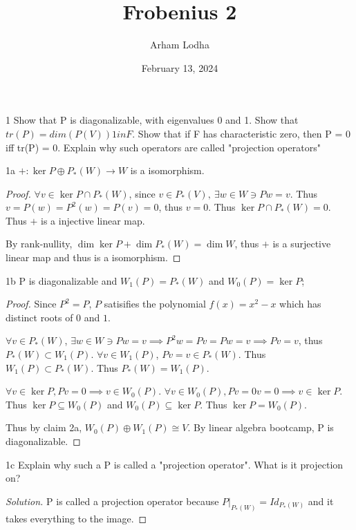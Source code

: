 \documentclass{article}
\newenvironment{solution}
{\renewcommand\qedsymbol{$\blacksquare$}\begin{proof}[Solution]}
{\end{proof}}
\begin{document}
\title{Frobenius 2}
\author{Arham Lodha}%
\date{February 13, 2024}%
\maketitle

\begin{PROB}{1}\label{Problem 1.}
    Show that P is diagonalizable, with eigenvalues 0 and 1. Show that $tr(P) = dim(P(V)) 1 in F$. Show that if F has characteristic zero, then P = 0 iff tr(P) = 0.  Explain why such operators are called "projection operators"
\end{PROB}
\begin{claim}{1a}\label{Claim 1a.}
    $+ : \ker P \oplus P_*(W) \to W$ is a isomorphism.
\end{claim}
\begin{proof}
    $\forall v \in \ker P \cap P_*(W)$, since $v \in P_*(V),~ \exists w \in W \ni Pw = v$. Thus $v = P(w) = P^2(w) = P(v) = 0$, thus $v = 0$. Thus $\ker P \cap P_*(W) = 0$. Thus $+$ is a injective linear map. 
    
    By rank-nullity, $\dim \ker P + \dim P_*(W) = \dim W$, thus $+$ is a surjective linear map and thus is a isomorphism.  
\end{proof}
\begin{claim}{1b}\label{Claim 1b.}
    P is diagonalizable and $W_1(P) = P_*(W)$ and $W_0(P)= \ker P$;  
\end{claim}
\begin{proof}
    Since $P^2 = P$, $P$ satisifies the polynomial $f(x) = x^2 - x$ which has distinct roots of $0$ and $1$. 
    
    $\forall v \in P_*(W)$, $\exists w \in W \ni Pw = v \implies P^2 w = Pv = Pw = v \implies Pv = v$, thus $P_*(W) \subset W_1(P)$. $\forall v \in W_1(P)$, $Pv = v \in P_*(W)$. Thus $W_1(P) \subset P_*(W)$. Thus $P_*(W) = W_1(P)$.
    
    $\forall v \in \ker P, Pv = 0 \implies v\in W_0(P)$. $\forall v \in W_0(P), Pv = 0v = 0 \implies v\in \ker P$. Thus $\ker P \subseteq W_0(P)$ and $W_0(P) \subseteq \ker P$. Thus $\ker P = W_0(P)$. 
    
    
    Thus by claim 2a, $W_0(P) \oplus W_1(P) \cong V$. By linear algebra bootcamp, P is diagonalizable. 
\end{proof}
\begin{PROB}{1c}\label{Problem 1c.}
    Explain why such a P is called a "projection operator". What is it projection on?
\end{PROB}
\begin{solution}
    P is called a projection operator because $P|_{P_*(W)} = Id_{P_*(W)}$ and it takes everything to the image.    
\end{solution}
\end{document}

